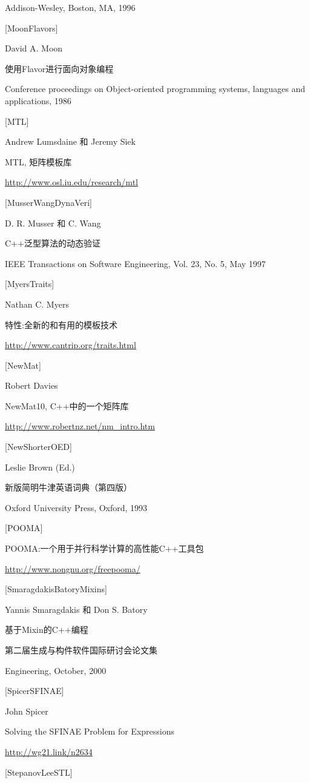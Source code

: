 Addison-Wesley, Boston, MA, 1996

{[MoonFlavors]}

David A. Moon

使用Flavor进行面向对象编程

Conference proceedings on Object-oriented programming systems, languages and applications, 1986

{[MTL]}

Andrew Lumsdaine 和 Jeremy Siek

MTL, 矩阵模板库

\url{http://www.osl.iu.edu/research/mtl}

{[MusserWangDynaVeri]}

D. R. Musser 和 C. Wang

C++泛型算法的动态验证

IEEE Transactions on Software Engineering, Vol. 23, No. 5, May 1997

{[MyersTraits]}

Nathan C. Myers

特性:全新的和有用的模板技术

\url{http://www.cantrip.org/traits.html}


{[NewMat]}

Robert Davies

NewMat10, C++中的一个矩阵库

\url{http://www.robertnz.net/nm_intro.htm}


{[NewShorterOED]}

Leslie Brown (Ed.)

新版简明牛津英语词典（第四版）

Oxford University Press, Oxford, 1993


{[POOMA]}

POOMA:一个用于并行科学计算的高性能C++工具包

\url{http://www.nongnu.org/freepooma/}


{[SmaragdakisBatoryMixins]}

Yannis Smaragdakis 和 Don S. Batory

基于Mixin的C++编程

第二届生成与构件软件国际研讨会论文集

Engineering, October, 2000


{[SpicerSFINAE]}

John Spicer

Solving the SFINAE Problem for Expressions

\url{http://wg21.link/n2634}

{[StepanovLeeSTL]}

